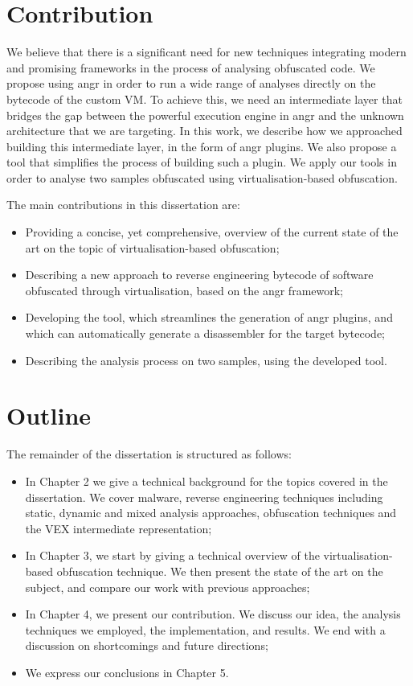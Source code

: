 \section{Contribution}

We believe that there is a significant need for new techniques integrating modern and promising frameworks in the process of analysing obfuscated code. We propose using angr in order to run a wide range of analyses directly on the bytecode of the custom \gls{VM}. To achieve this, we need an intermediate layer that bridges the gap between the powerful execution engine in angr and the unknown architecture that we are targeting. In this work, we describe how we approached building this intermediate layer, in the form of angr plugins. We also propose a tool that simplifies the process of building such a plugin. We apply our tools in order to analyse two samples obfuscated using virtualisation-based obfuscation.

The main contributions in this dissertation are:

\begin{itemize}
    \item Providing a concise, yet comprehensive, overview of the current state of the art on the topic of virtualisation-based obfuscation;
    \item Describing a new approach to reverse engineering bytecode of software obfuscated through virtualisation, based on the angr framework;
    \item Developing the  tool, which streamlines the generation of angr plugins, and which can automatically generate a disassembler for the target bytecode;
    \item Describing the analysis process on two samples, using the developed tool.
\end{itemize}

\section{Outline}

The remainder of the dissertation is structured as follows:

\begin{itemize}
    \item In Chapter 2 we give a technical background for the topics covered in the dissertation. We cover malware, reverse engineering techniques including static, dynamic and mixed analysis approaches, obfuscation techniques and the VEX intermediate representation;
    \item In Chapter 3, we start by giving a technical overview of the virtualisation-based obfuscation technique. We then present the state of the art on the subject, and compare our work with previous approaches;
    \item In Chapter 4, we present our contribution. We discuss our idea, the analysis techniques we employed, the implementation, and results. We end with a discussion on shortcomings and future directions;
    \item We express our conclusions in Chapter 5.
\end{itemize}

